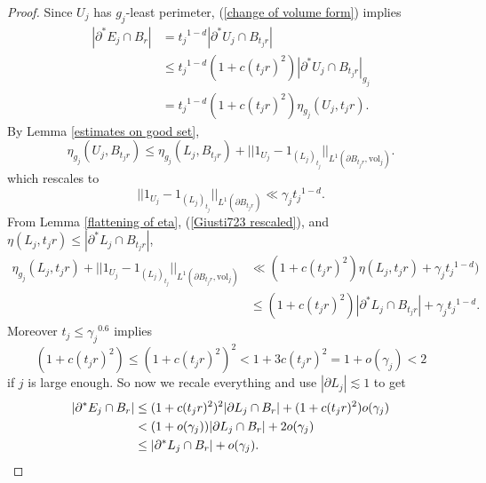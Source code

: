 \documentclass[reqno,12pt,letterpaper]{amsart}
\newcommand{\vol}{\mathrm{vol}}
\theoremstyle{definition}
\numberwithin{equation}{section}
\begin{document}
\begin{proof}
Since $U_j$ has $g_j$-least perimeter, (\ref{change of volume form}) implies
\begin{align*}
|\partial^* E_j \cap B_r| & = {t_j}^{1 - d}|\partial^* U_j \cap B_{t_jr}|\\
&\leq {t_j}^{1 - d} (1 + c(t_jr)^2) |\partial^* U_j \cap B_{t_jr}|_{g_j}\\
&= {t_j}^{1 - d} (1 + c(t_jr)^2) \eta_{g_j}(U_j, t_jr).
\end{align*}
By Lemma \ref{estimates on good set},
$$\eta_{g_j}(U_j, B_{t_jr}) \leq \eta_{g_j}(L_j, B_{t_jr}) + ||1_{U_j} - 1_{(L_j)_{t_j}}||_{L^1(\partial B_{t_jr}, \vol_j)}.$$
which rescales to
\begin{equation}\label{Giusti723 rescaled}
||1_{U_j} - 1_{(L_j)_{t_j}}||_{L^1(\partial B_{t_jr})} \ll \gamma_j {t_j}^{1 - d}.
\end{equation}
From Lemma \ref{flattening of eta}, (\ref{Giusti723 rescaled}), and $\eta(L_j, t_jr) \leq |\partial^* L_j \cap B_{t_jr}|$,
\begin{align*}
\eta_{g_j}(L_j, t_jr) + ||1_{U_j} - 1_{(L_j)_{t_j}}||_{L^1(\partial B_{t_jr}, \vol_j)} &\ll (1 + c(t_jr)^2) \eta(L_j, t_jr) + \gamma_j {t_j}^{1 - d})\\
&\leq (1 + c(t_jr)^2) |\partial^* L_j \cap B_{t_jr}| + \gamma_j {t_j}^{1 - d}.
\end{align*}
Moreover $t_j \leq {\gamma_j}^{0.6}$ implies
$$(1 + c(t_jr)^2) \leq (1 + c(t_jr)^2)^2 < 1 + 3c(t_jr)^2 = 1 + o(\gamma_j) < 2$$
if $j$ is large enough.
So now we recale everything and use $|\partial L_j| \lesssim 1$ to get
\begin{align*}
|\partial^* E_j \cap B_r| &\leq (1 + c(t_jr)^2)^2 |\partial L_j \cap B_r| + (1 + c(t_jr)^2) o(\gamma_j) \\
&< (1 + o(\gamma_j)) |\partial L_j \cap B_r| + 2o(\gamma_j)\\
&\leq |\partial^* L_j \cap B_r| + o(\gamma_j). \qedhere
\end{align*}
\end{proof}
\end{document}
